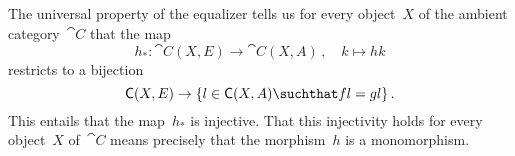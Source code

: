 \subsection{}

The universal property of the equalizer tells us for every object~$X$ of the ambient category~$\cat{C}$ that the map
\[
	h_*
	\colon
	\cat{C}(X, E) \to \cat{C}(X, A) \,,
	\quad
	k \mapsto h k
\]
restricts to a bijection
\[
	\cat{C}(X, E)
	\to
	\{ l \in \cat{C}(X, A) \suchthat f l = g l \} \,.
\]
This entails that the map~$h_*$ is injective.
That this injectivity holds for every object~$X$ of~$\cat{C}$ means precisely that the morphism~$h$ is a monomorphism.
